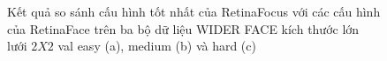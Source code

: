 {    \begin{figure}[H]
        \centering
        \caption{Kết quả so sánh cấu hình tốt nhất của RetinaFocus với các cấu hình của RetinaFace trên ba bộ dữ liệu WIDER FACE kích thước lớn lưới $2 X 2$ val easy (a), medium (b) và hard (c)}
        \label{fig:retinafocus_widerface_2k_val_rtnf}
    \end{figure}

}
